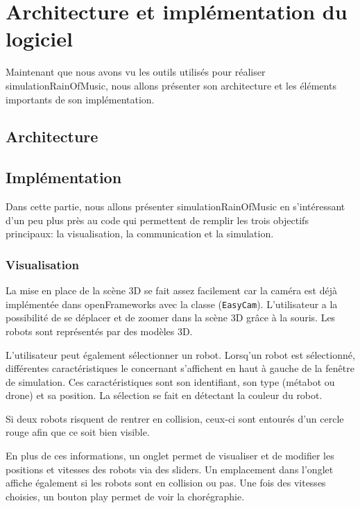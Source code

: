 \section{Architecture et implémentation du logiciel}

Maintenant que nous avons vu les outils utilisés pour réaliser simulationRainOfMusic, nous allons présenter son architecture et les éléments importants de son implémentation.

\subsection{Architecture}



\subsection{Implémentation}

Dans cette partie, nous allons présenter simulationRainOfMusic en s'intéressant d'un peu plus près au code qui permettent de remplir les trois objectifs principaux: la visualisation, la communication et la simulation.

\subsubsection{Visualisation}

La mise en place de la scène 3D se fait assez facilement car la caméra est déjà implémentée dans openFrameworks avec la classe (\verb|EasyCam|). L'utilisateur a la possibilité de se déplacer et de zoomer dans la scène 3D grâce à la souris. Les robots sont représentés par des modèles 3D.

L'utilisateur peut également sélectionner un robot. Lorsq'un robot est sélectionné, différentes caractéristiques le concernant s'affichent en haut à gauche de la fenêtre de simulation. Ces caractéristiques sont son identifiant, son type (métabot ou drone) et sa position. La sélection se fait en détectant la couleur du robot.

Si deux robots risquent de rentrer en collision, ceux-ci sont entourés d'un cercle rouge afin que ce soit bien visible.

En plus de ces informations, un onglet permet de visualiser et de modifier les positions et vitesses des robots via des sliders. Un emplacement dans l'onglet affiche également si les robots sont en collision ou pas. Une fois des vitesses choisies, un bouton play permet de voir la chorégraphie.


